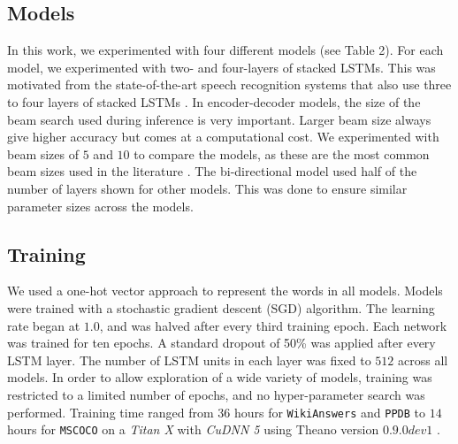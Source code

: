 \subsection{Models}
In this work, we experimented with four different models (see Table 2). For each model, we experimented with two- and four-layers of stacked LSTMs. This was motivated from the state-of-the-art speech recognition systems that also use three to four layers of stacked LSTMs \cite{li2015constructing}. In encoder-decoder models, the size of the beam search used during inference is very important. Larger beam size always give higher accuracy but comes at a computational cost. We experimented with beam sizes of $5$ and $10$ to compare the models, as these are the most common beam sizes used in the literature \cite{SutskeverVL14}. The bi-directional model used half of the number of layers shown for other models. This was done to ensure similar parameter sizes across the models.
 
\subsection{Training}
We used a one-hot vector approach to represent the words in all models. Models were trained with a stochastic gradient descent (SGD) algorithm. The learning rate began at $1.0$, and was halved after every third training epoch. Each network was trained for ten epochs. A standard dropout \cite{srivastava2014dropout} of 50\% was applied after every LSTM layer. The number of LSTM units in each layer was fixed to $512$ across all models. In order to allow exploration of a wide variety of models, training was restricted to a limited number of epochs, and no hyper-parameter search was performed. Training time ranged from $36$ hours for \texttt{WikiAnswers} and \texttt{PPDB} to $14$ hours for \texttt{MSCOCO} on a \emph{Titan X} with \emph{CuDNN 5} using Theano version $0.9.0dev1$ \cite{2016arXiv160502688short}.
 
